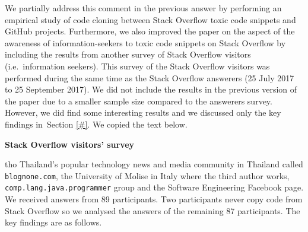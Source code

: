 \documentclass[a4paper,twoside,10pt]{reviewresponse}
\begin{document}

We partially address this comment in the previous answer by performing an empirical study of code cloning between Stack Overflow toxic code snippets and GitHub projects. Furthermore, we also improved the paper on the aspect of the awareness of information-seekers to toxic code snippets on Stack Overflow by including the results from another survey of Stack Overflow visitors (i.e.~information seekers). This survey of the Stack Overflow visitors was performed during the same time as the Stack Overflow answerers (25 July 2017 to 25 September 2017). We did not include the results in the previous version of the paper due to a smaller sample size compared to the answerers survey. However, we did find some interesting results and we discussed only the key findings in~Section \ref{#}. We copied the text below.

\textbf{Stack Overflow visitors' survey}

tho
Thailand's popular technology news and media community in Thailand called
\texttt{blognone.com}, the University of Molise in Italy where the third author
works, \texttt{comp.lang.java.programmer} group and the Software Engineering
Facebook page. We received answers from 89 participants. Two participants never
copy code from Stack Overflow so we analysed the answers of the remaining 87
participants. The key findings are as follows.
\end{document}
